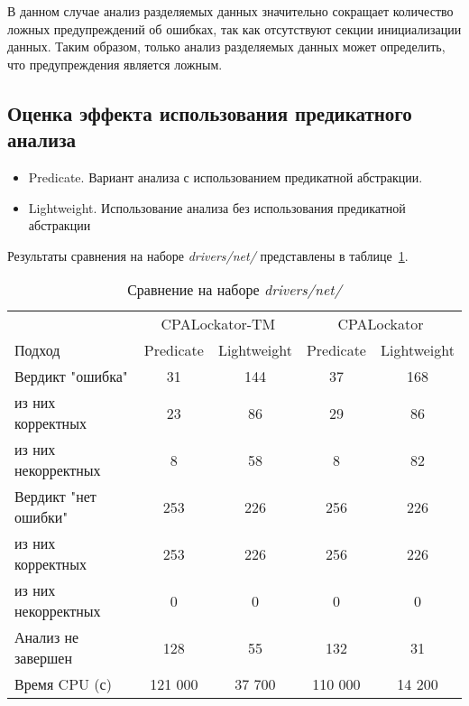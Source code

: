 В данном случае анализ разделяемых данных значительно сокращает количество ложных предупреждений об ошибках, так как отсутствуют секции инициализации данных.
Таким образом, только анализ разделяемых данных может определить, что предупреждения является ложным.

\subsection{Оценка эффекта использования предикатного анализа}

\begin{itemize}
\item Predicate. Вариант анализа с использованием предикатной абстракции.
\item Lightweight. Использование анализа без использования предикатной абстракции
\end{itemize}


Результаты сравнения на наборе \textit{drivers/net/} представлены в таблице~\ref{table-drivers-predicate}.

  \begin{table}[h]\footnotesize \centering
    \caption{Сравнение на наборе \textit{drivers/net/}}
  	\label{table-drivers-predicate}
    \begin{tabular}{ | l | c | c | c | c |}
      \hline
      & 			 \multicolumn{2}{|c|}{CPALockator-TM} & 	\multicolumn{2}{|c|}{CPALockator}\\
      Подход         				& Predicate & Lightweight 	& Predicate & Lightweight\\ \hline
      Вердикт "ошибка" 				& 31   		& 144   	& 37   		& 168  	\\ 
  \hspace{0.5cm} из них корректных 	& 23 		& 86 		& 29   		& 86 	\\ 
  \hspace{0.5cm} из них некорректных & 8 		& 58 		& 8   		& 82 	\\ \hline
      Вердикт "нет ошибки"  		& 253    	& 226    	& 256   	& 226 	\\ 
  \hspace{0.5cm} из них корректных 	& 253 		& 226    	& 256   	& 226 	\\
  \hspace{0.5cm} из них некорректных & 0 		& 0    		& 0   		& 0 	\\ \hline
      Анализ не завершен       		& 128    	& 55    	& 132   	& 31  	\\ \hline
      Время CPU (с)   				& 121 000 	& 37 700 	& 110 000  	& 14 200\\ 
      \hline
    \end{tabular}
  \end{table}

